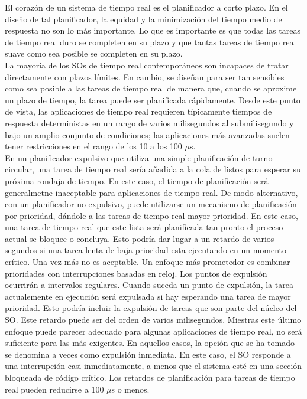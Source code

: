 \documentclass{article}
\begin{document}
				El corazón de un sistema de tiempo real es el planificador a corto plazo. En el diseño de tal planificador, la equidad y la minimización del tiempo medio de respuesta no son lo más importante. Lo que es importante es que todas las tareas de tiempo real duro se completen en su plazo y que tantas tareas de tiempo real suave como sea posible se completen en su plazo. \\
				
				La mayoría de los SOs de tiempo real contemporáneos son incapaces de tratar directamente con plazos límites. En cambio, se diseñan para ser tan sensibles como sea posible a las tareas de tiempo real de manera que, cuando se aproxime un plazo de tiempo, la tarea puede ser planificada rápidamente. Desde este punto de vista, las aplicaciones de tiempo real requieren típicamente tiempos de respuesta deterministas en un rango de varios milisegundos al submilisegundo y bajo un amplio conjunto de condiciones; las aplicaciones más avanzadas suelen tener restricciones en el rango de los 10 a los 100 $\mu$s. \\
				
				En un planificador expulsivo que utiliza una simple planificación de turno circular, una tarea de tiempo real sería añadida a la cola de listos para esperar su próxima rondaja de tiempo. En este caso, el tiempo de planificación será generalmetne inaceptable para aplicaciones de tiempo real. De modo alternativo, con un planificador no expulsivo, puede utilizarse un mecanismo de planificación por prioridad, dándole a las tareas de tiempo real mayor prioridad. En este caso, una tarea de tiempo real que este lista será planificada tan pronto el proceso actual se bloquee o concluya. Esto podría dar lugar a un retardo de varios segundos si una tarea lenta de baja prioridad esta ejecutando en un momento crítico. Una vez más no es aceptable. Un enfoque más prometedor es combinar prioridades con interrupciones basadas en reloj. Los puntos de expulsión ocurrirán a intervalos regulares. Cuando suceda un punto de expulsión, la tarea actualemente en ejecución será expulsada si hay esperando una tarea de mayor prioridad. Esto podría incluir la expulsión de tareas que son parte del núcleo del SO. Este retardo puede ser del orden de varios milisegundos. Miestras este último enfoque puede parecer adecuado para algunas aplicaciones de tiempo real, no será suficiente para las más exigentes. En aquellos casos, la opción que se ha tomado se denomina a veces como expulsión inmediata. En este caso, el SO responde a una interrupción casi inmediatamente, a menos que el sistema esté en una sección bloqueada de código crítico. Los retardos de planificación para tareas de tiempo real pueden reducirse a 100 $\mu$s o menos.
				
\end{document}
